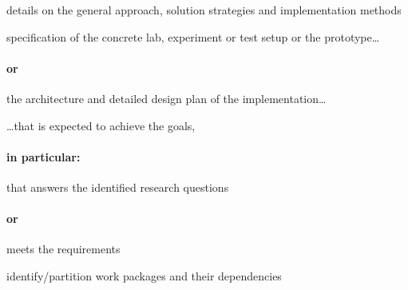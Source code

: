 \begin{shaded}
\noindent details on the general approach, solution strategies and implementation methods

\vspace{5em}

\noindent specification of the concrete lab, experiment or test setup or the prototype\dots
\paragraph{or} the architecture and detailed design plan of the implementation\dots

\vspace{3em}

\noindent \dots that is expected to achieve the goals,
\paragraph{in particular:} that answers the identified research questions
\paragraph{or} meets the requirements

\vspace{5em}

\noindent identify/partition work packages and their dependencies
\end{shaded}


\lipsum[29-30]
